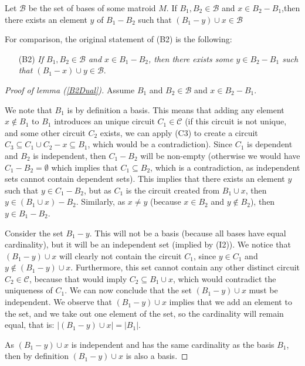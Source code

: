 \begin{lemma}[(B2)$^*$]\label{B2Dual}
    Let $\mathcal{B}$ be the set of bases of some matroid $M$. If $B_1, B_2 \in \mathcal{B}$ and $x \in B_2 - B_1$,then there exists an element $y$ of $B_1 - B_2$ such that $(B_1 - y) \cup x \in \mathcal{B}$
\end{lemma}

For comparison, the original statement of (B2) is the following:
\begin{enumerate}
    \item[(B2)] \textit{If $B_1,B_2\in \mathcal{B}$ and $x\in B_1 - B_2$, then there exists some $y\in B_2 - B_1$ such that $(B_1 - x)\cup y \in \mathcal{B}$}.
\end{enumerate}

\begin{proof}[Proof of lemma (\ref{B2Dual})]
Assume $B_1$ and $B_2 \in \mathcal{B}$ and $x \in B_2 - B_1$.

    We note that $B_1$ is by definition a basis. This means that adding any element $x \not\in B _1 $ to $B _1 $ introduces an unique circuit $C_1 \in \mathcal{C}$ (if this circuit is not unique, and some other circuit $C _2 $ exists, we can apply (C3) to create a circuit $C _3 \subseteq C _1 \cup C _2 - x \subseteq B_1$, which would be a contradiction). Since $C_1$ is dependent and $B_2$ is independent, then $C_1 - B_2$ will be non-empty (otherwise we would have $C _1 - B _2 = \emptyset$ which implies that $C _1 \subseteq B _2$, which is a contradiction, as independent sets cannot contain dependent sets). This implies that there exists an element $y$ such that $y \in C_1 - B_2$, but as $C_1$ is the circuit created from $B_1 \cup x$, then $y \in (B_1 \cup x) - B_2$. Similarly, as $x \neq y$ (because $x \in B _2 $ and $y \not\in B _2$), then $y \in B_1 - B_2$. 

    Consider the set $B_1 - y$. This will not be a basis (because all bases have equal cardinality), but it will be an independent set (implied by (I2)). We notice that $(B_1 - y)\cup x$ will clearly not contain the circuit $C_1$, since $y \in C _1 $ and $y \not\in (B _1 - y) \cup x$. Furthermore, this set cannot contain any other distinct circuit $C _2 \in \mathcal{C}$, because that would imply $C _2 \subseteq B _1 \cup x$, which would contradict the uniqueness of $C _1 $. We can now conclude that the set $(B_1 - y)\cup x$ must be independent. We observe that $(B_1 - y)\cup x$ implies that we add an element to the set, and we take out one element of the set, so the cardinality will remain equal, that is: $|(B_1 - y)\cup x|=|B_1|$.

As $(B_1 - y)\cup x$ is independent and has the same cardinality as the basis $B_1$, then by definition $(B_1 - y)\cup x$ is also a basis. 
\end{proof}


